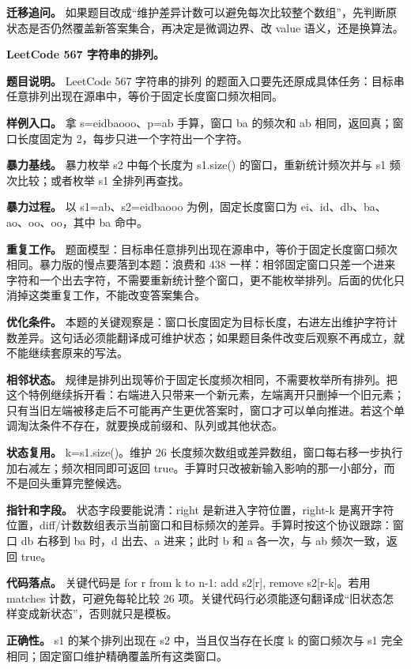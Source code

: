 \textbf{迁移追问。} 如果题目改成“维护差异计数可以避免每次比较整个数组”，先判断原状态是否仍然覆盖新答案集合，再决定是微调边界、改 value 语义，还是换算法。

\noindent\textbf{LeetCode 567 字符串的排列。}

\textbf{题目说明。} LeetCode 567 字符串的排列 的题面入口要先还原成具体任务：目标串任意排列出现在源串中，等价于固定长度窗口频次相同。

\textbf{样例入口。} 拿 s=eidbaooo、p=ab 手算，窗口 ba 的频次和 ab 相同，返回真；窗口长度固定为 2，每步只进一个字符出一个字符。

\textbf{暴力基线。} 暴力枚举 s2 中每个长度为 s1.size() 的窗口，重新统计频次并与 s1 频次比较；或者枚举 s1 全排列再查找。

\textbf{暴力过程。} 以 s1=ab、s2=eidbaooo 为例，固定长度窗口为 ei、id、db、ba、ao、oo、oo，其中 ba 命中。

\textbf{重复工作。} 题面模型：目标串任意排列出现在源串中，等价于固定长度窗口频次相同。暴力版的慢点要落到本题：浪费和 438 一样：相邻固定窗口只差一个进来字符和一个出去字符，不需要重新统计整个窗口，更不能枚举排列。后面的优化只消掉这类重复工作，不能改变答案集合。

\textbf{优化条件。} 本题的关键观察是：窗口长度固定为目标长度，右进左出维护字符计数差异。这句话必须能翻译成可维护状态；如果题目条件改变后观察不再成立，就不能继续套原来的写法。

\textbf{相邻状态。} 规律是排列出现等价于固定长度频次相同，不需要枚举所有排列。把这个特例继续拆开看：右端进入只带来一个新元素，左端离开只删掉一个旧元素；只有当旧左端被移走后不可能再产生更优答案时，窗口才可以单向推进。若这个单调淘汰条件不存在，就要换成前缀和、队列或其他状态。

\textbf{状态复用。} k=s1.size()。维护 26 长度频次数组或差异数组，窗口每右移一步执行加右减左；频次相同即可返回 true。手算时只改被新输入影响的那一小部分，而不是回头重算完整候选。

\textbf{指针和字段。} 状态字段要能说清：right 是新进入字符位置，right-k 是离开字符位置，diff/计数数组表示当前窗口和目标频次的差异。手算时按这个协议跟踪：窗口 db 右移到 ba 时，d 出去、a 进来；此时 b 和 a 各一次，与 ab 频次一致，返回 true。

\textbf{代码落点。} 关键代码是 for r from k to n-1: add s2[r], remove s2[r-k]。若用 matches 计数，可避免每轮比较 26 项。关键代码行必须能逐句翻译成“旧状态怎样变成新状态”，否则就只是模板。

\textbf{正确性。} s1 的某个排列出现在 s2 中，当且仅当存在长度 k 的窗口频次与 s1 完全相同；固定窗口维护精确覆盖所有这类窗口。

